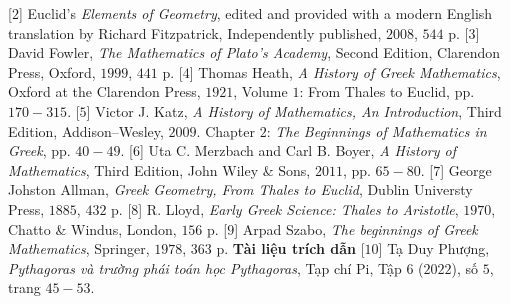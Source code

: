\begin{multicols}{2}
	\vskip 0.1cm
	[$2$] Euclid’s \textit{Elements of Geometry}, edited and provided with a modern English translation by Richard Fitzpatrick, Independently published, $2008$, $544$ p.
	\vskip 0.1cm
	[$3$] David Fowler, \textit{The Mathematics of Plato’s Academy}, Second Edition, Clarendon Press, Oxford, $1999$, $441$ p.
	\vskip 0.1cm   
	[$4$] Thomas Heath, \textit{A History of Greek Mathematics}, Oxford at the Clarendon Press, $1921$, Volume $1$: From Thales to Euclid, pp. $170-315$.
	\vskip 0.1cm   
	[$5$] Victor J. Katz, \textit{A History of Mathematics, An Introduction}, Third Edition, Addison--Wesley, $2009$. Chapter $2$: \textit{The Beginnings of Mathematics in Greek}, pp. $40-49$.
	\vskip 0.1cm
	[$6$] Uta C. Merzbach and Carl B. Boyer, \textit{A
	History of Mathematics}, Third Edition, John Wiley \& Sons, $2011$, pp. $65-80$.
	\vskip 0.1cm
	[$7$] George Johston Allman, \textit{Greek Geometry, From Thales to Euclid}, Dublin Universty Press, $1885$, $432$ p.
	\vskip 0.1cm  
	[$8$] R. Lloyd, \textit{Early Greek Science: Thales to Aristotle}, $1970$, Chatto \& Windus, London, $156$ p.
	\vskip 0.1cm 
	[$9$] Arpad Szabo, \textit{The beginnings of Greek Mathematics}, Springer, $1978$, $363$ p.
	\vskip 0.1cm
	\textbf{\color{lichsutoanhoc}Tài liệu trích dẫn}
	\vskip 0.1cm
	[$10$] Tạ Duy Phượng, \textit{Pythagoras và trường phái toán học Pythagoras}, Tạp chí Pi, Tập $6$ ($2022$), số $5$, trang $45-53$.
\end{multicols}